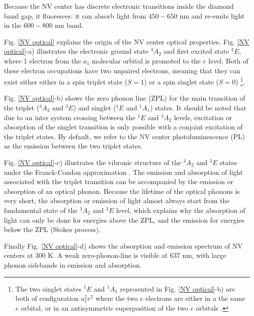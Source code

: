 \documentclass[a4paper, 11pt]{book}
\begin{document}
Because the NV center has discrete electronic transitions inside the diamond band gap, it fluoresces: it can absorb light from $450-650$ nm and re-emits light in the $600-800$ nm band.

Fig. \ref{NV optical} explains the origin of the NV center optical properties. Fig. \ref{NV optical}-a) illustrates the electronic ground state $^3A_2$ and first excited state $^3E$, where 1 electron from the $a_1$ molecular orbital is promoted to the $e$ level. Both of these electron occupations have two unpaired electrons, meaning that they can exist either either in a spin triplet state ($S=1$) or a spin singlet state ($S=0$) \footnote{The two singlet states $^1E$ and $^1A_1$ represented in Fig. \ref{NV optical}-b) are both of configuration $a_1^2e^2$ where the two $e$ electrons are either in a the same $e$ orbital, or in an antisymmetric superposition of the two $e$ orbitals \citep{doherty2011negatively}.}. 

Fig. \ref{NV optical}-b) shows the zero phonon line (ZPL) for the main transition of the triplet ($^3A_2$ and $^3E$) and singlet ($^1E$ and $^1A_1$) states. It should be noted that due to an inter system crossing between the $^1E$ and $^3A_2$ levels, excitation or absorption of the singlet transition is only possible with a conjoint excitation of the triplet states. By default, we refer to the NV center photoluminescence (PL) as the emission between the two triplet states.

Fig. \ref{NV optical}-c) illustrates the vibronic structure of the $^3A_2$ and $^3E$ states under the Franck-Condon approximation \citep{gali2011time}. The emission and absorption of light associated with the triplet transition can be accompanied by the emission or absorption of an optical phonon. Because the lifetime of the optical phonons is very short, the absorption or emission of light almost always start from the fundamental state of the $^3A_2$ and $^3E$ level, which explains why the absorption of light can only be done for energies above the ZPL, and the emission for energies below the ZPL (Stokes process).

Finally Fig. \ref{NV optical}-d) shows the absorption and emission spectrum of NV centers at 300 K. A weak zero-phonon-line is visible at 637 nm, with large phonon sidebands in emission and absorption.
\end{document}
